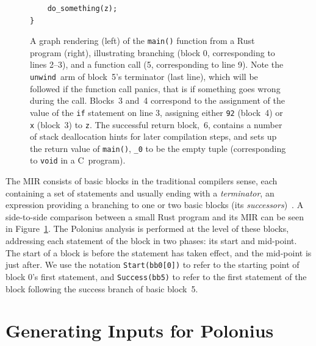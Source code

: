 \documentclass[11pt,a4paper,twoside,openany]{report}
\newenvironment{sourcecode}{\captionsetup{type=listing}}{}
\newcommand{\InRust}[1]{\texttt{#1}}
\renewcommand\_{\textunderscore\allowbreak}
\begin{document}
\begin{figure}
\begin{minipage}{.5\textwidth}
\begin{sourcecode}
\begin{verbatim}
    do_something(z);
}
\end{verbatim}
\end{sourcecode}
\end{minipage}
\caption[MIR of a Small Rust Program With Function Call]{A graph rendering
  (left) of the \InRust{main()} function from a Rust program (right),
  illustrating branching (block 0, corresponding to lines 2--3), and a function
  call (5, corresponding to line 9). Note the \texttt{unwind}~arm of block~5's
  terminator (last line), which will be followed if the function call panics,
  that is if something goes wrong during the call. Blocks~3 and~4 correspond to
  the assignment of the value of the \InRust{if} statement on line 3, assigning
  either \InRust{92} (block~4) or \InRust{x} (block~3) to \InRust{z}. The
  successful return block,~6, contains a number of stack deallocation hints for
  later compilation steps, and sets up the return value of \InRust{main()},
  \InRust{_0} to be the empty tuple (corresponding to \texttt{void} in a
  C~program).}\label{fig:mir-example}
\end{figure}

The MIR consists of basic blocks in the traditional compilers sense, each
containing a set of statements and usually ending with a \emph{terminator}, an
expression providing a branching to one or two basic blocks (its
\emph{successors})~\cite{mir_rfc}. A side-to-side comparison between a small
Rust program and its MIR can be seen in Figure~\ref{fig:mir-example}. The
Polonius analysis is performed at the level of these blocks, addressing each
statement of the block in two phases: its start and mid-point. The start of a
block is before the statement has taken effect, and the mid-point is just after.
We use the notation \InRust{Start(bb0[0])} to refer to the starting point of
block 0's first statement, and \InRust{Success(bb5)} to refer to the first
statement of the block following the success branch of basic block~5.

\section{Generating Inputs for Polonius}
\end{document}
